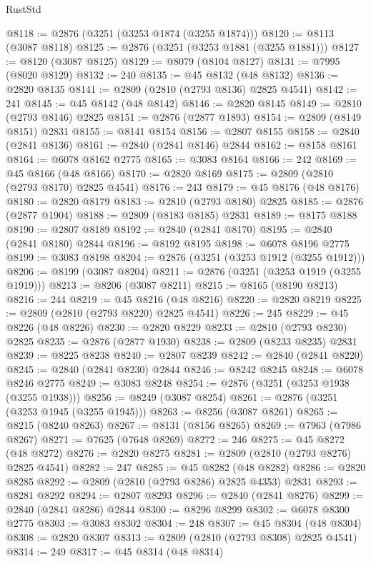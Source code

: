\begin{lexlean}{RustStd}
\begin{coremodule}
@8118 := @2876 (@3251 (@3253 @1874 (@3255 @1874)))
@8120 := @8113 (@3087 @8118)
@8125 := @2876 (@3251 (@3253 @1881 (@3255 @1881)))
@8127 := @8120 (@3087 @8125)
@8129 := @8079 (@8104 @8127)
@8131 := @7995 (@8020 @8129)
@8132 := 240
@8135 := @45 @8132 (@48 @8132)
@8136 := @2820 @8135
@8141 := @2809 (@2810 (@2793 @8136) @2825 @4541)
@8142 := 241
@8145 := @45 @8142 (@48 @8142)
@8146 := @2820 @8145
@8149 := @2810 (@2793 @8146) @2825
@8151 := @2876 (@2877 @1893)
@8154 := @2809 (@8149 @8151) @2831
@8155 := @8141 @8154
@8156 := @2807 @8155
@8158 := @2840 (@2841 @8136)
@8161 := @2840 (@2841 @8146) @2844
@8162 := @8158 @8161
@8164 := @6078 @8162 @2775
@8165 := @3083 @8164
@8166 := 242
@8169 := @45 @8166 (@48 @8166)
@8170 := @2820 @8169
@8175 := @2809 (@2810 (@2793 @8170) @2825 @4541)
@8176 := 243
@8179 := @45 @8176 (@48 @8176)
@8180 := @2820 @8179
@8183 := @2810 (@2793 @8180) @2825
@8185 := @2876 (@2877 @1904)
@8188 := @2809 (@8183 @8185) @2831
@8189 := @8175 @8188
@8190 := @2807 @8189
@8192 := @2840 (@2841 @8170)
@8195 := @2840 (@2841 @8180) @2844
@8196 := @8192 @8195
@8198 := @6078 @8196 @2775
@8199 := @3083 @8198
@8204 := @2876 (@3251 (@3253 @1912 (@3255 @1912)))
@8206 := @8199 (@3087 @8204)
@8211 := @2876 (@3251 (@3253 @1919 (@3255 @1919)))
@8213 := @8206 (@3087 @8211)
@8215 := @8165 (@8190 @8213)
@8216 := 244
@8219 := @45 @8216 (@48 @8216)
@8220 := @2820 @8219
@8225 := @2809 (@2810 (@2793 @8220) @2825 @4541)
@8226 := 245
@8229 := @45 @8226 (@48 @8226)
@8230 := @2820 @8229
@8233 := @2810 (@2793 @8230) @2825
@8235 := @2876 (@2877 @1930)
@8238 := @2809 (@8233 @8235) @2831
@8239 := @8225 @8238
@8240 := @2807 @8239
@8242 := @2840 (@2841 @8220)
@8245 := @2840 (@2841 @8230) @2844
@8246 := @8242 @8245
@8248 := @6078 @8246 @2775
@8249 := @3083 @8248
@8254 := @2876 (@3251 (@3253 @1938 (@3255 @1938)))
@8256 := @8249 (@3087 @8254)
@8261 := @2876 (@3251 (@3253 @1945 (@3255 @1945)))
@8263 := @8256 (@3087 @8261)
@8265 := @8215 (@8240 @8263)
@8267 := @8131 (@8156 @8265)
@8269 := @7963 (@7986 @8267)
@8271 := @7625 (@7648 @8269)
@8272 := 246
@8275 := @45 @8272 (@48 @8272)
@8276 := @2820 @8275
@8281 := @2809 (@2810 (@2793 @8276) @2825 @4541)
@8282 := 247
@8285 := @45 @8282 (@48 @8282)
@8286 := @2820 @8285
@8292 := @2809 (@2810 (@2793 @8286) @2825 @4353) @2831
@8293 := @8281 @8292
@8294 := @2807 @8293
@8296 := @2840 (@2841 @8276)
@8299 := @2840 (@2841 @8286) @2844
@8300 := @8296 @8299
@8302 := @6078 @8300 @2775
@8303 := @3083 @8302
@8304 := 248
@8307 := @45 @8304 (@48 @8304)
@8308 := @2820 @8307
@8313 := @2809 (@2810 (@2793 @8308) @2825 @4541)
@8314 := 249
@8317 := @45 @8314 (@48 @8314)

\end{coremodule}
\end{lexlean}
